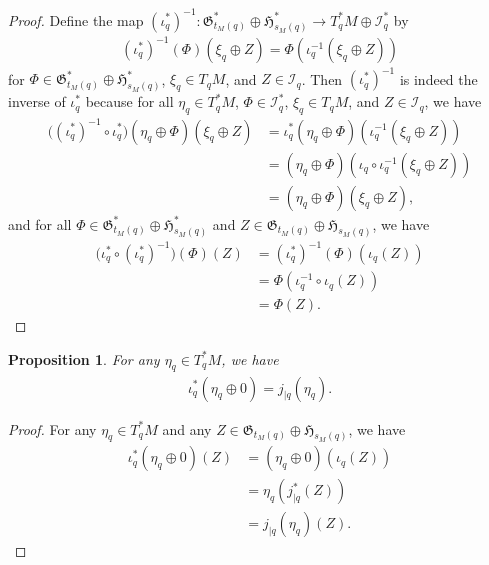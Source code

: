 \documentclass[sn-mathphys,Numbered]{sn-jnl}
\newtheorem{proposition}[theorem]{Proposition}%
\begin{document}
\begin{proof}
    Define the map $(\iota^*_q)^{-1}: \mathfrak{G}_{t_M(q)}^*\oplus \mathfrak{H}_{s_M(q)}^*\to T^*_qM\oplus\mathcal{I}_q^*$ by
    \begin{align}
        (\iota^*_q)^{-1}(\Phi)(\xi_q\oplus Z) = \Phi(\iota_q^{-1}(\xi_q\oplus Z))
    \end{align}
for $\Phi\in \mathfrak{G}_{t_M(q)}^*\oplus \mathfrak{H}_{s_M(q)}^*$, $\xi_q\in T_qM$, and $Z\in \mathcal{I}_q$.  Then $(\iota_q^*)^{-1}$ is indeed the inverse of $\iota_q^*$ because for all $\eta_q\in T_q^*M$, $\Phi\in \mathcal{I}_q^*$, $\xi_q\in T_qM$, and $Z\in \mathcal{I}_q$, we have
\begin{align}
    \big((\iota_q^*)^{-1}\circ\iota_q^*\big)(\eta_q\oplus\Phi)(\xi_q\oplus Z) &= \iota_q^*(\eta_q\oplus \Phi)(\iota_q^{-1}(\xi_q\oplus Z))\\
    &= (\eta_q\oplus \Phi)(\iota_q\circ\iota_q^{-1}(\xi_q\oplus Z))\\
    &=(\eta_q\oplus \Phi)(\xi_q\oplus Z),
\end{align}
and for all $\Phi\in \mathfrak{G}_{t_M(q)}^*\oplus \mathfrak{H}_{s_M(q)}^*$ and $Z\in \mathfrak{G}_{t_M(q)}\oplus\mathfrak{H}_{s_M(q)}$, we have
\begin{align}
    \big(\iota^*_q\circ(\iota_q^*)^{-1}\big)(\Phi)(Z) &= (\iota_q^*)^{-1}(\Phi)(\iota_q(Z))\\
    &= \Phi(\iota_q^{-1}\circ\iota_q(Z))\\
    &= \Phi(Z).
\end{align}

\end{proof}

\begin{proposition}
    For any $\eta_q\in T^*_qM$, we have
    \begin{align}
        \iota_q^*(\eta_q\oplus 0) = j_{|q}(\eta_q).
    \end{align}
\end{proposition}

\begin{proof}
    For any $\eta_q\in T_q^*M$ and any $Z\in\mathfrak{G}_{t_M(q)}\oplus\mathfrak{H}_{s_M(q)}$, we have
\begin{align}
    \iota_q^*(\eta_q\oplus 0)(Z) &= (\eta_q\oplus 0)(\iota_q(Z))\\
    &= \eta_q(j^*_{|q}(Z))\\
    &= j_{|q}(\eta_q)(Z).
\end{align}
\end{proof}\bigskip
\end{document}
